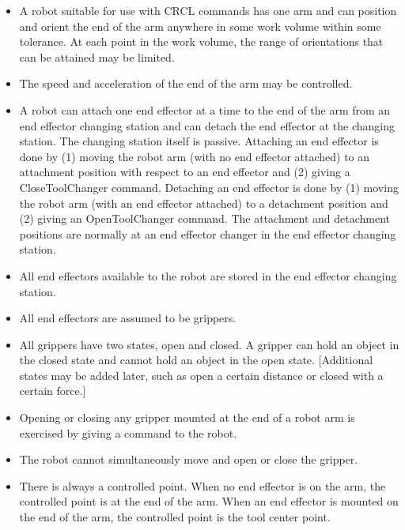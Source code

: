 \begin{itemize}
\item A robot suitable for use with CRCL commands has one arm and can position
and orient the end of the arm anywhere in some work volume within some
tolerance. At each point in the work volume, the range of orientations that
can be attained may be limited.

\item The speed and acceleration of the end of the arm may be controlled.

\item A robot can attach one end effector at a time to the end of the arm from an
end effector changing station and can detach the end effector at the
changing station. The changing station itself is passive.  Attaching an end
effector is done by (1) moving the robot arm (with no end effector
attached) to an attachment position with respect to an end effector and (2)
giving a CloseToolChanger command. Detaching an end effector is done by (1)
moving the robot arm (with an end effector attached) to a detachment
position and (2) giving an OpenToolChanger command. The attachment and
detachment positions are normally at an end effector changer in the end
effector changing station.

\item All end effectors available to the robot are stored in the end effector
changing station.

\item All end effectors are assumed to be grippers.

\item All grippers have two states, open and closed. A gripper can hold an
object in the closed state and cannot hold an object in the open
state. [Additional states may be added later, such as open a certain
distance or closed with a certain force.]

\item Opening or closing any gripper mounted at the end of a robot arm is
exercised by giving a command to the robot.

\item The robot cannot simultaneously move and open or close the gripper.

\item There is always a controlled point. When no end effector is on the arm,
the controlled point is at the end of the arm. When an end effector
is mounted on the end of the arm, the controlled point is the tool
center point.


\end{itemize}
